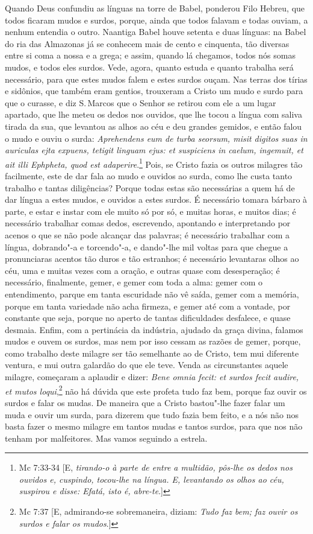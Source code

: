 Quando Deus confundiu as línguas na torre de Babel, ponderou Filo
Hebreu, que todos ficaram mudos e surdos, porque, ainda que todos
falavam e todas ouviam, a nenhum entendia o outro. Naantiga Babel houve
setenta e duas línguas: na Babel do ria das Almazonas já se conhecem
mais de cento e cinquenta, tão diversas entre si coma a nossa e a grega;
e assim, quando lá chegamos, todos nós somas mudos, e todos eles surdos.
Vede, agora, quanto estuda e quanto trabalha será necessário, para que
estes mudos falem e estes surdos ouçam. Nas terras dos tírias e
sidônios, que também eram gentios, trouxeram a Cristo um mudo e surdo
para que o curasse, e diz S.\,Marcos que o
Senhor se retirou com ele a um lugar apartado, que lhe meteu os dedos
nos ouvidos, que lhe tocou a língua com saliva tirada da sua, que
levantou as alhos ao céu e deu grandes gemidos, e então falou o mudo e
ouviu o surda: \emph{Aprehendens eum de turba seorsum, misit digitos
suas in auriculas ejta expuens, tetigit linguam ejus: et suspiciens in
caelum, ingemuit, et ait illi Ephpheta, quod est adaperire}.\footnote{Mc 7:33-34 [E, \emph{tirando-o à parte de entre a multidão, pôs-lhe os dedos nos ouvidos e, cuspindo,
tocou-lhe na língua. E, levantando os olhos ao céu, suspirou e disse: Efatá, isto é, abre-te}.]}
Pois, se Cristo fazia os outros milagres tão facilmente, este de dar
fala ao mudo e ouvidos ao surda, como lhe custa tanto trabalho e tantas
diligências? Porque todas estas são necessárias a quem há de dar língua
a estes mudos, e ouvidos a estes surdos. É necessário tomara bárbaro à
parte, e estar e instar com ele muito só por só, e muitas horas, e
muitos dias; é necessário trabalhar comas dedos, escrevendo, apontando e
interpretando por acenos o que se não pode alcançar das palavras; é
necessário trabalhar com a língua, dobrando"-a e torcendo"-a, e dando"-lhe
mil voltas para que chegue a pronunciaras acentos tão duros e tão
estranhos; é necessário levantaras olhos ao céu, uma e muitas vezes com
a oração, e outras quase com desesperação; é necessário, finalmente,
gemer, e gemer com toda a alma: gemer com o entendimento, parque em
tanta escuridade não vê saída, gemer com a memória, porque em tanta
variedade não acha firmeza, e gemer até com a vontade, por constante que
seja, porque no aperto de tantas dificuldades desfalece, e quase
desmaia. Enfim, com a pertinácia da indústria, ajudado da graça divina,
falamos mudos e ouvem os surdos, mas nem por isso cessam as razões de
gemer, porque, como trabalho deste milagre ser tão semelhante ao de
Cristo, tem mui diferente ventura, e mui outra galardão do que ele teve.
Venda as circunstantes aquele milagre, começaram a aplaudir e dizer:
\emph{Bene omnia fecit: et surdos fecit audire, et mutos loqui},\footnote{Mc 7:37 [E, admirando-se sobremaneira, diziam: \emph{Tudo faz bem; faz ouvir os surdos e falar os mudos}.]} não há dúvida que este profeta tudo faz bem, porque faz
ouvir os surdos e falar os mudas. De maneira que a Cristo bastou"-lhe
fazer falar um muda e ouvir um surda, para dizerem que tudo fazia bem
feito, e a nós não nos basta fazer o mesmo milagre em tantos mudas e
tantos surdos, para que nos não tenham por malfeitores. Mas vamos
seguindo a estrela.

